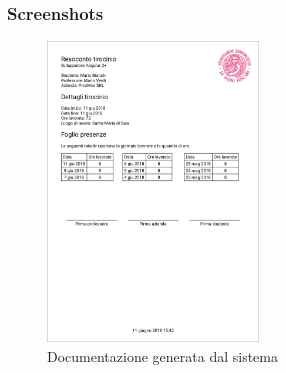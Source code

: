 \subsubsection{Screenshots}
\begin{figure}[H]
	\centering
	\includegraphics[width=0.5\textwidth]{Figs/screenshots/pdfdocs}     
	\caption[Screenshot: documentazione generata dal sistema]{Documentazione generata dal sistema}
	\label{fig:screenshot:10}
\end{figure}